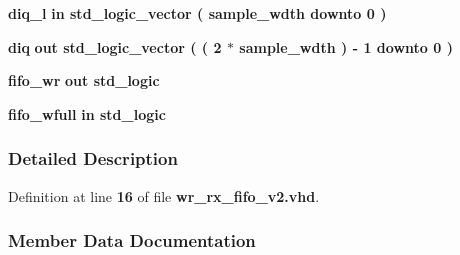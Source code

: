 \begin{DoxyCompactItemize}
\item 
{\bf diq\+\_\+l}  {\bfseries {\bfseries \textcolor{keywordflow}{in}\textcolor{vhdlchar}{ }}} {\bfseries \textcolor{comment}{std\+\_\+logic\+\_\+vector}\textcolor{vhdlchar}{ }\textcolor{vhdlchar}{(}\textcolor{vhdlchar}{ }\textcolor{vhdlchar}{ }\textcolor{vhdlchar}{ }\textcolor{vhdlchar}{ }{\bfseries {\bf sample\+\_\+wdth}} \textcolor{vhdlchar}{ }\textcolor{keywordflow}{downto}\textcolor{vhdlchar}{ }\textcolor{vhdlchar}{ } \textcolor{vhdldigit}{0} \textcolor{vhdlchar}{ }\textcolor{vhdlchar}{)}\textcolor{vhdlchar}{ }} 
\item 
{\bf diq}  {\bfseries {\bfseries \textcolor{keywordflow}{out}\textcolor{vhdlchar}{ }}} {\bfseries \textcolor{comment}{std\+\_\+logic\+\_\+vector}\textcolor{vhdlchar}{ }\textcolor{vhdlchar}{(}\textcolor{vhdlchar}{ }\textcolor{vhdlchar}{(}\textcolor{vhdlchar}{ }\textcolor{vhdlchar}{ } \textcolor{vhdldigit}{2} \textcolor{vhdlchar}{$\ast$}\textcolor{vhdlchar}{ }\textcolor{vhdlchar}{ }\textcolor{vhdlchar}{ }{\bfseries {\bf sample\+\_\+wdth}} \textcolor{vhdlchar}{ }\textcolor{vhdlchar}{)}\textcolor{vhdlchar}{ }\textcolor{vhdlchar}{-\/}\textcolor{vhdlchar}{ } \textcolor{vhdldigit}{1} \textcolor{vhdlchar}{ }\textcolor{keywordflow}{downto}\textcolor{vhdlchar}{ }\textcolor{vhdlchar}{ } \textcolor{vhdldigit}{0} \textcolor{vhdlchar}{ }\textcolor{vhdlchar}{)}\textcolor{vhdlchar}{ }} 
\item 
{\bf fifo\+\_\+wr}  {\bfseries {\bfseries \textcolor{keywordflow}{out}\textcolor{vhdlchar}{ }}} {\bfseries \textcolor{comment}{std\+\_\+logic}\textcolor{vhdlchar}{ }} 
\item 
{\bf fifo\+\_\+wfull}  {\bfseries {\bfseries \textcolor{keywordflow}{in}\textcolor{vhdlchar}{ }}} {\bfseries \textcolor{comment}{std\+\_\+logic}\textcolor{vhdlchar}{ }} 
\end{DoxyCompactItemize}


\subsubsection{Detailed Description}


Definition at line {\bf 16} of file {\bf wr\+\_\+rx\+\_\+fifo\+\_\+v2.\+vhd}.



\subsubsection{Member Data Documentation}
